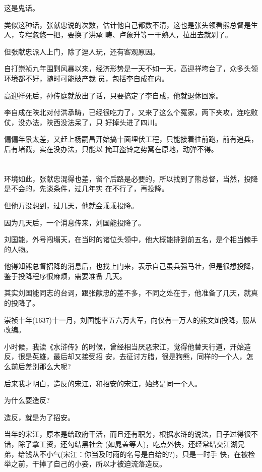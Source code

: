 \documentclass[11pt,a4paper,onecolumn]{article}
\begin{document}
这是鬼话。

类似这种话，张献忠说的次数，估计他自己都数不清，这也是张头领看熊总督是生人，专程忽悠一把，要换了洪承
畴、卢象升等一干熟人，拉出去就剁了。

但张献忠派人上门，除了逗人玩，还有客观原因。

自打崇祯九年围剿风暴以来，经济形势是一天不如一天，高迎祥垮台了，众多头领环境都不好，随时可能破产裁
员，包括李自成在内。

高迎祥死后，孙传庭就放出了话，只要搞定了李自成，他就退休回家。

李自成在陕北对付洪承畴，已经很吃力了，又来了这么个冤家，两下夹攻，连吃败仗，没办法，陕西没法呆了，只
好掉头进了四川。

偏偏年景太差，又赶上杨嗣昌开始搞十面埋伏工程，只能接着往前跑，前有追兵，后有堵截，实在没办法，只能以
掩耳盗铃之势窝在原地，动弹不得。

\section[\thesection]{}

环境如此，张献忠混得也差，留个后路是必要的，所以找到了熊总督，当然，投降是不会的，先谈条件，过几年实
在不行了，再投降。

但他万没想到，过几天，他就会乖乖投降。

因为几天后，一个消息传来，刘国能投降了。

刘国能，外号闯塌天，在当时的诸位头领中，他大概能排到前五名，是个相当棘手的人物。

他得知熊总督招降的消息后，也找上门来，表示自己虽兵强马壮，但是很想投降，鉴于投降程序很麻烦，需要准备
几天。

其实刘国能同志的台词，跟张献忠的差不多，不同之处在于，他准备了几天，就真的投降了。

崇祯十年(1637)十一月，刘国能率五六万大军，向仅有一万人的熊文灿投降，服从改编。

小时候，我读《水浒传》的时候，曾经相当厌恶宋江，觉得他替天行道，开始造反，很是英雄，最后却又接受招
安，去征讨方腊，很是狗熊，同样的一个人，怎么前后差别那么大呢?

后来我才明白，造反的宋江，和招安的宋江，始终是同一个人。

为什么要造反?

造反，就是为了招安。

当年的宋江，原本是给政府干活，而且还有职务，根据水浒的说法，日子过得很不错，除了拿工资，还勾结黑社会
(如晁盖等人)，吃点外快，还经常结交江湖兄弟，给钱从不小气(宋江：你当及时雨的名号是白给的?)，只是一时手
快，在被检举之前，干掉了自己的小妾，所以才被迫流落造反。
\end{document}
